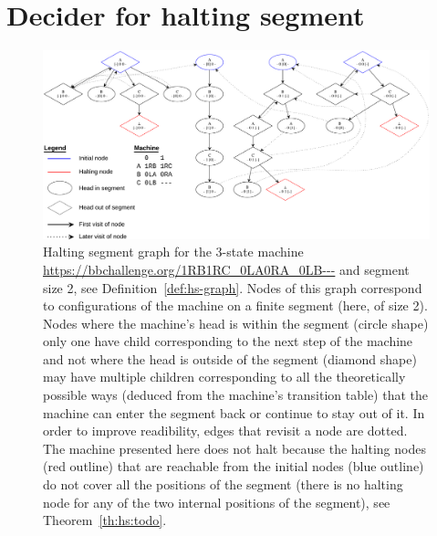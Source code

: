 \section{Decider for halting segment}\label{sec:halting-segment}

\begin{figure}
  \centering
  \includegraphics[width=1\textwidth]{halting-segment.pdf}
  \caption{Halting segment graph for the 3-state machine \url{https://bbchallenge.org/1RB1RC_0LA0RA_0LB---} and segment size 2, see Definition~\ref{def:hs-graph}. Nodes of this graph correspond to configurations of the machine on a finite segment (here, of size 2). Nodes where the machine's head is within the segment (circle shape) only one have child corresponding to the next step of the machine and not where the head is outside of the segment (diamond shape) may have multiple children corresponding to all the theoretically possible ways (deduced from the machine's transition table) that the machine can enter the segment back or continue to stay out of it. In order to improve readibility, edges that revisit a node are dotted. The machine presented here does not halt because the halting nodes (red outline) that are reachable from the initial nodes (blue outline) do not cover all the positions of the segment (there is no halting node for any of the two internal positions of the segment), see Theorem~\ref{th:hs:todo}. }
\end{figure}